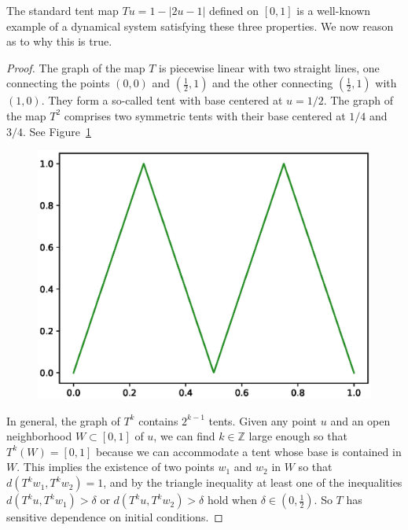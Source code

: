 \begin{Example}\label{ex_standardTentMap}\rm
  The standard tent map $Tu=1-|2u-1|$ defined on $[0,1]$ is a well-known example of a dynamical system satisfying these three properties.  We now reason as to why this is true. 
  
  \begin{proof}
    The graph of the map $T$ is piecewise linear with two straight lines, one connecting the points $(0,0)$ and $(\frac{1}{2},1)$ and the other connecting $(\frac{1}{2},1)$ with $(1,0)$. They form a so-called tent with base centered at $u=1/2$. The graph of the map $T^2$ comprises two symmetric tents with their base centered at $1/4$ and $3/4$. See Figure~\ref{fig:T2tentmap}

    \begin{figure}[ht]
      \includegraphics[scale=0.6]{Graphs/_tentmap_2.eps}
          \centering
          \label{fig:T2tentmap}
    \end{figure}
    
    In general, the graph of  $T^k$ contains $2^{k-1}$ tents.
    Given any point $u$ and an open neighborhood $W \subset[0,1]$ of $u$, we can find $k\in\mathbb{Z}$ large enough so that $T^k(W) = [0,1]$ because we can accommodate a tent whose base is contained in $W$. %
    This implies the existence of two points $w_1$ and $w_2$ in $W$ so that $d(T^kw_1,T^kw_2)= 1$, and by the triangle inequality  at least one of the inequalities $d(T^ku,T^kw_1)> \delta$ or $d(T^ku,T^kw_2)> \delta$ hold when $\delta\in (0,\frac{1}{2})$.  So $T$ has sensitive dependence on initial conditions.
    

\end{proof}
\end{Example}
